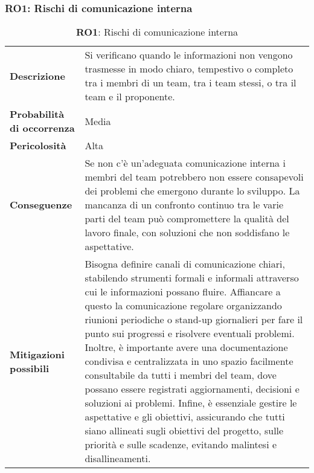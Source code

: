 \subsubsection{RO1: Rischi di comunicazione interna}
\label{sec:Rischi di comunicazione interna}
\begin{table}[h!]
    \centering
    \renewcommand{\arraystretch}{1.5} %
    \begin{tabularx}{\textwidth}{|X|X|}\hline
    \rowcolor[HTML]{FFD700} 
    \multicolumn{2}{|c|}{\textbf{Rischi di comunicazione interna}} \\ \hline
    \textbf{Descrizione} &  Si verificano quando le informazioni non vengono trasmesse in modo chiaro, 
    tempestivo o completo tra i membri di un team, tra i team stessi, o tra il team e il proponente.\\ \hline
    \textbf{Probabilità di occorrenza} & Media \\ \hline
    \textbf{Pericolosità} & Alta \\ \hline
    \textbf{Conseguenze} & Se non c'è un'adeguata comunicazione interna i membri del team potrebbero non essere consapevoli dei problemi che emergono durante lo sviluppo. 
    La mancanza di un confronto continuo tra le varie parti del team può compromettere la qualità del lavoro finale, con soluzioni che non soddisfano le aspettative.\\ \hline
    \textbf{Mitigazioni possibili} & Bisogna definire canali di comunicazione chiari, stabilendo strumenti formali e informali attraverso cui le informazioni possano fluire. Affiancare a questo la comunicazione regolare organizzando riunioni periodiche o stand-up giornalieri per fare il punto sui progressi e risolvere eventuali problemi. 
    Inoltre, è importante avere una documentazione condivisa e centralizzata in uno spazio facilmente consultabile da tutti i membri del team, dove possano essere registrati aggiornamenti, decisioni e soluzioni ai problemi. Infine, è essenziale gestire le aspettative e gli obiettivi, assicurando che tutti siano allineati sugli obiettivi del progetto, sulle priorità e sulle scadenze, evitando malintesi e disallineamenti. \\ \hline
    \end{tabularx}
    \caption{\textbf{RO1}: Rischi di comunicazione interna}
    \end{table}

\newpage

